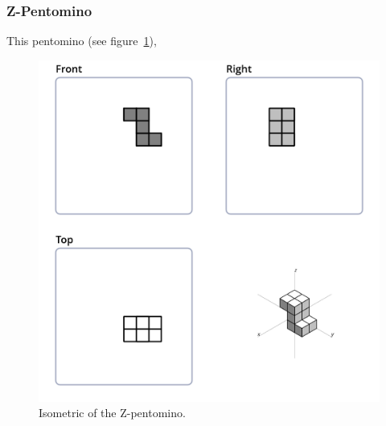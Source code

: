 \subsubsection{Z-Pentomino}
\label{sec:z-pentomino}
This pentomino (see figure~\ref{fig:iso-pent-z}),


\begin{figure}
	\centering
	\includegraphics[scale=0.3]{iso_diagrams/z.png}
	\caption{Isometric of the Z-pentomino.}
  \label{fig:iso-pent-z}
\end{figure}
